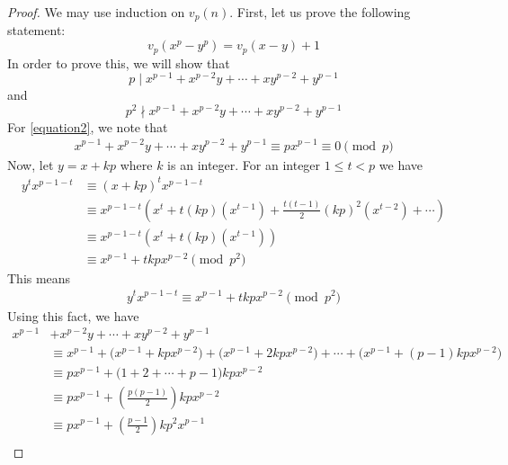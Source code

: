 \documentclass[main.tex]{subfile}
\begin{document}
    \begin{proof}
        We may use induction on $v_p(n).$ First, let us prove the following statement:
            \begin{equation}\label{equation1}
                v_p(  x^p - y^p ) = v_p  ( x - y ) + 1
            \end{equation}
        In order to prove this, we will show that
            \begin{equation}\label{equation2}
                p \mid x^{p-1}+x^{p-2}y+\cdots+xy^{p-2}+y^{p-1}
            \end{equation}
        and
            \begin{equation}\label{equation3}
                p^2 \nmid x^{p-1}+x^{p-2}y+\cdots+xy^{p-2}+y^{p-1}
            \end{equation}
        For \eqref{equation2}, we note that
        \begin{align*}
        x^{p-1}+x^{p-2}y+\cdots+xy^{p-2}+y^{p-1} \equiv px^{p-1} \equiv 0 \pmod p
        \end{align*}
        Now, let $y=x+kp$ where $k$ is an integer. For an integer $ 1  \leq t <p$ we have
            \begin{align*}
                y^t x^{p-1-t}
                	& \equiv (x+kp)^t x^{p-1-t} \\
	                & \equiv x^{p-1-t} \left( x^t + t(kp)(x^{t-1})+ \frac{t(t-1)}{2} (kp)^2 (x^{t-2}) +\cdots \right) \\
	                & \equiv x^{p-1-t} \left( x^t + t(kp)(x^{t-1}) \right) \\
	                & \equiv x^{p-1}+tkpx^{p-2} \pmod{p^2}
            \end{align*}
        This means
            \begin{align*}
            	y^t x^{p-1-t} \equiv x^{p-1}+tkpx^{p-2} \pmod{p^2}
            \end{align*}
        Using this fact, we have
            \begin{align*}
                x^{p-1}& +x^{p-2}y+\cdots+xy^{p-2}+y^{p-1} \\
                & \equiv x^{p-1}+\big(x^{p-1}+kpx^{p-2}\big)+\big(x^{p-1}+2kpx^{p-2}\big)+\cdots+\big(x^{p-1} +(p-1)kpx^{p-2}\big) \\
                & \equiv px^{p-1} + \big(1+2+\cdots+p-1\big)kpx^{p-2} \\
                & \equiv px^{p-1} + \left( \frac{p(p-1)}{2} \right) kpx^{p-2} \\
                & \equiv px^{p-1} + \left( \frac{p-1}{2} \right) kp^2x^{p-1} \\

\end{align*}
\end{proof}
\end{document}
